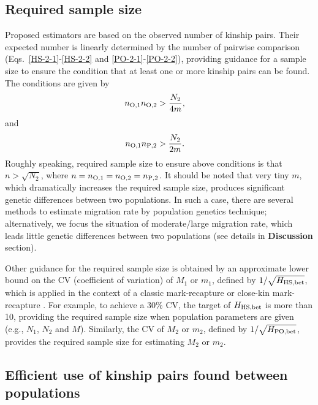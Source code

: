 \documentclass[12pt, English]{article}
\begin{document}
\begin{spacing}{1.9}
\subsection{Required sample size}

Proposed estimators are based on the observed number of kinship pairs. Their expected number is linearly determined by the number of pairwise comparison (Eqs.~\ref{HS-2-1}-\ref{HS-2-2} and \ref{PO-2-1}-\ref{PO-2-2}), providing guidance for a sample size to ensure the condition that at least one or more kinship pairs can be found. The conditions are given by
\begin{align}
n_{\rm O, 1} n_{\rm O, 2} &> \frac{ N_{2} } { 4m },
\label{RS-1}
\end{align}
and
\begin{align}
n_{\rm O, 1} n_{\rm P, 2} &> \frac{ N_{2} } { 2m }.
\label{RS-2}
\end{align}
Roughly speaking, required sample size to ensure above conditions is that $n>\sqrt{N_2}$, where $n = n_{\rm O, 1}=n_{\rm O, 2}=n_{\rm P, 2}$. It should be noted that very tiny $m$, which dramatically increases the required sample size, produces significant genetic differences between two populations. In such a case, there are several methods to estimate migration rate by population genetics technique; alternatively, we focus the situation of moderate/large migration rate, which leads little genetic differences between two populations (see details in {\bf Discussion} section). 

Other guidance for the required sample size is obtained by an approximate lower bound on the CV (coefficient of variation) of $M_1$ or $m_1$, defined by $1/\sqrt{H_{\rm HS, bet}}$, which is applied in the context of a classic mark-recapture \cite[]{seber1982estimation} or close-kin mark-recapture \cite[]{bravington2016close}. For example, to achieve a 30\% CV, the target of $H_{\rm HS, bet}$ is more than 10, providing the required sample size when population parameters are given (e.g., $N_1$, $N_2$ and $M$). Similarly, the CV of $M_2$ or $m_2$, defined by $1/\sqrt{H_{\rm PO, bet}}$, provides the required sample size for estimating $M_2$ or $m_2$. 

\subsection{Efficient use of kinship pairs found between populations}


\end{spacing}
\end{document}
